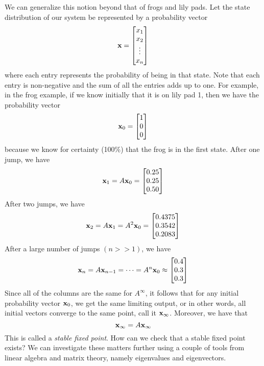 We can generalize this notion beyond that of frogs and lily pads.
Let the state distribution of our system be represented by a probability vector
\[
{\bf x} = \begin{bmatrix}
x_1\\
x_2\\
\vdots\\
x_n
\end{bmatrix}
\]
where each entry represents the probability of being in that state.
Note that each entry is non-negative and the sum of all the entries adds up to one.
For example, in the frog example, if we know initially that it is on lily pad 1, then we have the probability vector
\[
{\bf x}_0 = \begin{bmatrix}
1\\
0\\
0
\end{bmatrix}
\]
because we know for certainty (100\%) that the frog is in the first state.
After one jump, we have
\[
{\bf x}_1 = A {\bf x}_0 = \begin{bmatrix}
0.25\\
0.25\\
0.50
\end{bmatrix}
\]
After two jumps, we have
\[
{\bf x}_2 = A {\bf x}_1 = A^2 {\bf x}_0 = \begin{bmatrix}
0.4375\\
0.3542\\
0.2083
\end{bmatrix}
\]
After a large number of jumps $(n>>1)$, we have
\[
{\bf x}_n = A {\bf x}_{n-1} = \dots = A^n {\bf x}_0 \approx \begin{bmatrix}
0.4\\
0.3\\
0.3
\end{bmatrix}
\]
Since all of the columns are the same for $A^\infty$, it follows that for any initial probability vector ${\bf x}_0$, we get the same limiting output, or in other words, all initial vectors converge to the same point, call it ${\bf x}_\infty$.
Moreover, we have that
\[
{\bf x}_\infty = A {\bf x}_\infty
\]
This is called a \emph{stable fixed point}.
How can we check that a stable fixed point exists?
We can investigate these matters further using a couple of tools from
linear algebra and matrix theory, namely eigenvalues and eigenvectors.

